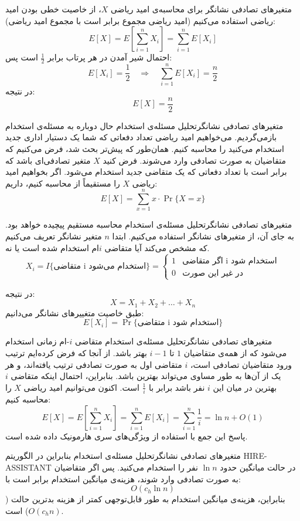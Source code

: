 \begin{itemframe}{متغیرهای تصادفی نشانگر}
\itm
برای محاسبه‌ی امید ریاضی $X$، از خاصیت خطی بودن امید ریاضی استفاده می‌کنیم (امید ریاضی مجموع برابر است با مجموع امید ریاضی):
$$
E[X] = E[ \sum_{i=1}^{n} X_i ] = \sum_{i=1}^{n} E[X_i]
$$
\itm
احتمال شیر آمدن در هر پرتاب برابر $\frac{1}{2}$ است پس:
$$
E[X_i] = \frac{1}{2} \quad \Rightarrow \quad \sum_{i=1}^{n} E[X_i] = \frac{n}{2}
$$
\itm
در نتیجه:
$$
E[X] = \frac{n}{2}
$$
\end{itemframe}


\begin{itemframe-s}{متغیرهای تصادفی نشانگر}{تحلیل مسئله‌ی استخدام}
\itm
حال دوباره به مسئله‌ی استخدام بازمی‌گردیم. می‌خواهیم امید ریاضی تعداد دفعاتی که شما یک دستیار اداری جدید استخدام می‌کنید را محاسبه کنیم. همان‌طور که پیش‌تر بحث شد، فرض می‌کنیم که متقاضیان به صورت تصادفی وارد می‌شوند.
\itm
فرض کنید $X$ متغیر تصادفی‌ای باشد که برابر است با تعداد دفعاتی که یک متقاضی جدید استخدام می‌شود. اگر بخواهیم امید ریاضی $X$ را مستقیماً از محاسبه کنیم، داریم:
$$
E[X] = \sum_{x=1}^{n} x \cdot \Pr\{X = x\}
$$
\end{itemframe-s}


\begin{itemframe-s}{متغیرهای تصادفی نشانگر}{تحلیل مسئله‌ی استخدام}
\itm
محاسبه مستقیم پیچیده خواهد بود. به جای آن، از متغیرهای نشانگر استفاده می‌کنیم. ابتدا $n$ متغیر نشانگر تعریف می‌کنیم که مشخص می‌کند آیا متقاضی $i$ام استخدام شده است یا نه.
$$
X_i = I\{\text{متقاضی i استخدام می‌شود}\} =
\begin{cases}
1 & \text{اگر متقاضی i استخدام شود} \\
0 & \text{در غیر این صورت}
\end{cases}
$$

\itm
در نتیجه:
$$
X = X_1 + X_2 + \dots + X_n
$$
\itm
طبق خاصیت متغییرهای نشانگر می‌دانیم:
$$
E[X_i] = \Pr\{\text{متقاضی i استخدام شود}\}
$$
\end{itemframe-s}


\begin{itemframe-s}{متغیرهای تصادفی نشانگر}{تحلیل مسئله‌ی استخدام}
\itm
متقاضی $i$-ام زمانی استخدام می‌شود که از همه‌ی متقاضیان $1$ تا $i-1$ بهتر باشد. از آنجا که فرض کرده‌ایم ترتیب ورود متقاضیان تصادفی است، $i$ متقاضی اول به صورت تصادفی ترتیب یافته‌اند، و هر یک از آن‌ها به طور مساوی می‌تواند بهترین باشد. بنابراین، احتمال اینکه متقاضی $i$ بهترین در میان این $i$ نفر باشد برابر با $\frac{1}{i}$ است.
\itm
اکنون می‌توانیم امید ریاضی $X$ را محاسبه کنیم:
$$
E[X] = E [ \sum_{i=1}^{n} X_i ]
= \sum_{i=1}^{n} E[X_i]
= \sum_{i=1}^{n} \frac{1}{i}
= \ln n + O(1)
$$
\itm
پاسخ این جمع با استفاده از ویژگی‌های سری هارمونیک داده شده است.
\end{itemframe-s}


\begin{itemframe-s}{متغیرهای تصادفی نشانگر}{تحلیل مسئله‌ی استخدام}
\itm
بنابراین در الگوریتم HIRE-ASSISTANT در حالت میانگین حدود
$\ln n$
نفر را استخدام می‌کنید.
\itm
پس اگر متقاضیان به صورت تصادفی وارد شوند، هزینه‌ی میانگین استخدام برابر است با:
$$
O(c_h \ln n)
$$
بنابراین، هزینه‌ی میانگین استخدام به طور قابل‌توجهی کمتر از هزینه بدترین حالت ($O(c_h n)$) است.
\end{itemframe-s}
